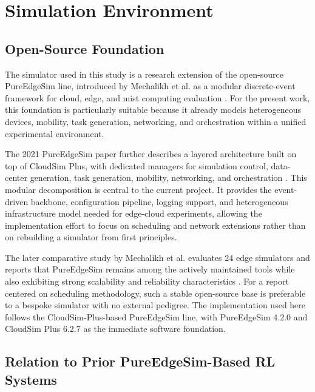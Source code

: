 \newpage
\section{Simulation Environment}
\label{sec:simulation}

\subsection{Open-Source Foundation}
\label{subsec:simulation-overview}

The simulator used in this study is a research extension of the open-source PureEdgeSim line, introduced by Mechalikh et al. as a modular discrete-event framework for cloud, edge, and mist computing evaluation \cite{mechalikh2021pureedgesim, pureedgesimgithub}. For the present work, this foundation is particularly suitable because it already models heterogeneous devices, mobility, task generation, networking, and orchestration within a unified experimental environment.

The 2021 PureEdgeSim paper further describes a layered architecture built on top of CloudSim Plus, with dedicated managers for simulation control, data-center generation, task generation, mobility, networking, and orchestration \cite{mechalikh2021pureedgesim, silvafilho2017cloudsimplus}. This modular decomposition is central to the current project. It provides the event-driven backbone, configuration pipeline, logging support, and heterogeneous infrastructure model needed for edge-cloud experiments, allowing the implementation effort to focus on scheduling and network extensions rather than on rebuilding a simulator from first principles.

The later comparative study by Mechalikh et al. evaluates 24 edge simulators and reports that PureEdgeSim remains among the actively maintained tools while also exhibiting strong scalability and reliability characteristics \cite{mechalikh2025quality}. For a report centered on scheduling methodology, such a stable open-source base is preferable to a bespoke simulator with no external pedigree. The implementation used here follows the CloudSim-Plus-based PureEdgeSim line, with PureEdgeSim 4.2.0 and CloudSim Plus 6.2.7 as the immediate software foundation.

\subsection{Relation to Prior PureEdgeSim-Based RL Systems}
\label{subsec:customized-environment}

